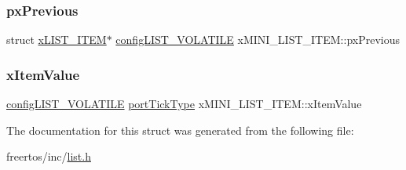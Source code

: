 \mbox{\label{structx_m_i_n_i___l_i_s_t___i_t_e_m_a732c666bb97560eb1b094a2c411269ab}} 
\subsubsection{\texorpdfstring{px\+Previous}{pxPrevious}}
{\footnotesize\ttfamily struct \mbox{\hyperlink{structx_l_i_s_t___i_t_e_m}{x\+L\+I\+S\+T\+\_\+\+I\+T\+EM}}$\ast$ \mbox{\hyperlink{list_8h_a2d5de557c5561c8980d1bf51d87d8cba}{config\+L\+I\+S\+T\+\_\+\+V\+O\+L\+A\+T\+I\+LE}} x\+M\+I\+N\+I\+\_\+\+L\+I\+S\+T\+\_\+\+I\+T\+E\+M\+::px\+Previous}

\mbox{\label{structx_m_i_n_i___l_i_s_t___i_t_e_m_a15a3f1840e5f2a5f59c7f06a355f6e82}} 
\subsubsection{\texorpdfstring{x\+Item\+Value}{xItemValue}}
{\footnotesize\ttfamily \mbox{\hyperlink{list_8h_a2d5de557c5561c8980d1bf51d87d8cba}{config\+L\+I\+S\+T\+\_\+\+V\+O\+L\+A\+T\+I\+LE}} \mbox{\hyperlink{portmacro_8h_a4d746b2ff8fafc490b764c66411ec457}{port\+Tick\+Type}} x\+M\+I\+N\+I\+\_\+\+L\+I\+S\+T\+\_\+\+I\+T\+E\+M\+::x\+Item\+Value}



The documentation for this struct was generated from the following file\+:\begin{DoxyCompactItemize}
\item 
freertos/inc/\mbox{\hyperlink{list_8h}{list.\+h}}\end{DoxyCompactItemize}
